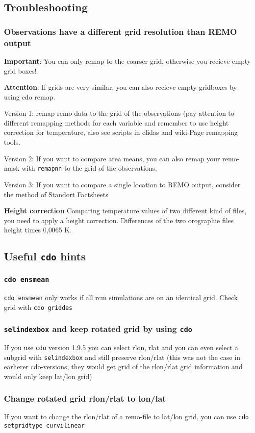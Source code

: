\subsection{Troubleshooting}

\subsubsection{Observations have a different grid resolution than REMO output}

\textbf{Important}: You can only remap to the coarser grid, otherwise you recieve empty grid boxes!

\textbf{Attention}: If grids are very similar, you can also recieve empty gridboxes by using cdo remap.

Version 1: remap remo data to the grid of the observations (pay attention to different remapping
methods for each variable and remember to use height correction for temperature,
also see scripts in clidas and wiki-Page remapping tools.

Version 2: If you want to compare area means, you can also remap your remo-mask with \texttt{remapnn} to the grid of the observations.

Version 3: If you want to compare a single location to REMO output, consider the method of Standort Factsheets 

\textbf{Height correction} Comparing temperature values of two different kind of files, you need to apply a height correction. 
Differences of the two orographie files \delta height times 0,0065 K.

\subsection{Useful \texttt{cdo} hints}

\subsubsection{\texttt{cdo ensmean}}
\texttt{cdo ensmean} only works if all rcm simulations are on an identical grid.
Check grid with \texttt{cdo griddes}

\subsubsection{\texttt{selindexbox} and keep rotated grid by using \texttt{cdo}}
If you use \texttt{cdo} version 1.9.5 you can select rlon, rlat and you can even select a subgrid with \texttt{selindexbox} and still preserve rlon/rlat
(this was not the case in earlierer cdo-versions, they would get grid of the rlon/rlat grid information and would only keep lat/lon grid)

\subsubsection{Change rotated grid rlon/rlat to lon/lat}
If you want to change the rlon/rlat of a remo-file to lat/lon grid, you can use \texttt{cdo setgridtype curvilinear}


